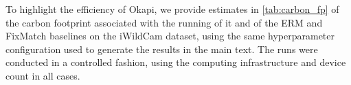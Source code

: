 To highlight the efficiency of Okapi, we provide estimates in \ref{tab:carbon_fp} of the carbon footprint associated
with the running of it and of the ERM and FixMatch baselines on the iWildCam dataset, using the
same hyperparameter configuration used to generate the results in the main text.
The runs were conducted in a controlled fashion, using the computing infrastructure and device
count in all cases.

\begin{table}[htp]
	\centering
	\caption{
	  Comparison of the estimated carbon footprint (kgCoeq) of Okapi with the ERM and
	  FixMatch baselines per replicate of the iWildCam dataset. 
	  For the controlled training conducted to enable fair computation of these estimates, we
	  used a private infrastructure with an estimated
	  carbon efficiency of 0.432 kgCOeq/kWh and RTX 3090 GPUs, each job being run on a single
	  GPU, coupled with four data-loading workers.
	}
	\label{tab:carbon_fp}
\end{table}
